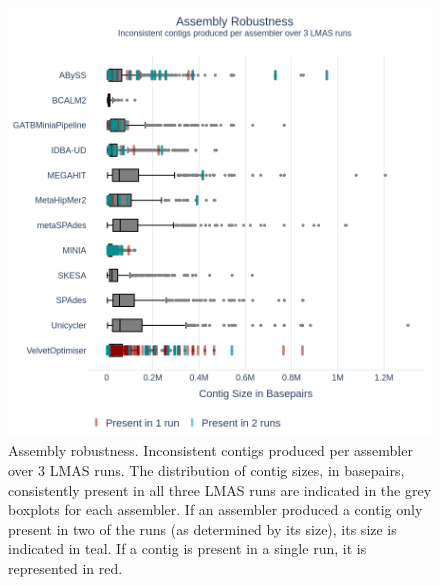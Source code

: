 \begin{figure}[h!]
\centering
\includegraphics[width=\textwidth]{figures/chapter 5/Figure 3.png}
\caption{Assembly robustness. Inconsistent contigs produced per assembler over 3 LMAS runs. The distribution of contig sizes, in basepairs, consistently present in all three LMAS runs are indicated in the grey boxplots for each assembler. If an assembler produced a contig only present in two of the runs (as determined by its size), its size is indicated in teal. If a contig is present in a single run, it is represented in red.}
\label{fig:chap5_figure3}
\end{figure}

